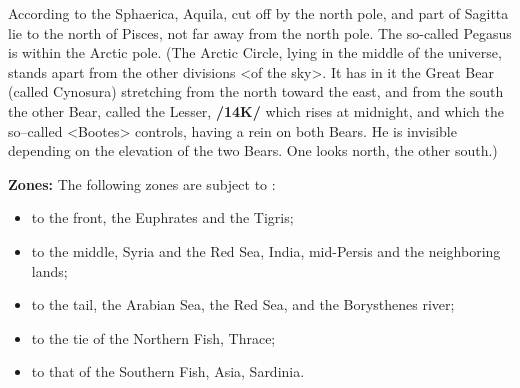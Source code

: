 According to the Sphaerica, Aquila, cut off by the north pole, and part of Sagitta lie to the north of Pisces, not far away from the north pole. The so-called Pegasus is within the Arctic pole. (The Arctic Circle, lying in the middle of the universe, stands apart from the other divisions <of the sky>. It has in it the Great Bear (called Cynosura) stretching from the north toward the east, and from the south the other Bear, called the Lesser, \textbf{/14K/} which rises at midnight, and which the so–called  <Bootes> controls, having a rein on both Bears. He is invisible depending on the elevation of the two Bears. One looks north, the other south.) 

\textbf{Zones:} The following zones are subject to \Pisces: 
\begin{itemize}
\item to the front, the Euphrates and the Tigris; 
\item to the middle, Syria and the Red Sea, India, mid-Persis and the neighboring lands; 
\item to the tail, the Arabian Sea, the Red Sea, and the Borysthenes river; 
\item to the tie of the Northern Fish, Thrace; 
\item to that of the Southern Fish, Asia, Sardinia.
\end{itemize}

\newpage